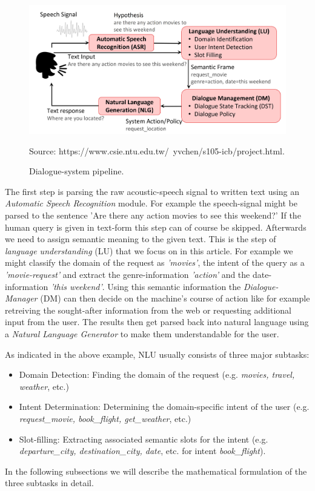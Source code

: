 \documentclass[twoside,11pt,a4paper]{article}
\theoremstyle{break}
\begin{document}
\begin{figure}
	\begin{center}
		\includegraphics[width=13cm]{pipeline.jpg}
		\caption{Dialogue-system pipeline.}
		Source: https://www.csie.ntu.edu.tw/~yvchen/s105-icb/project.html.
		\label{fig:pipeline}
	\end{center}
\end{figure}

The first step is parsing the raw acoustic-speech signal to written text using an \textit{Automatic Speech Recognition} module. For example the speech-signal might be parsed to the sentence 'Are there any action movies to see this weekend?' If the human query is given in text-form this step can of course be skipped. Afterwards we need to assign semantic meaning to the given text. This is the step of \textit{language understanding} (LU) that we focus on in this article. For example we might classify the domain of the request as \textit{'movies'}, the intent of the query as a \textit{'movie-request'} and extract the genre-information \textit{'action'} and the date-information \textit{'this weekend'}. Using this semantic information the \textit{Dialogue-Manager} (DM) can then decide on the machine's course of action like for example retreiving the sought-after information from the web or requesting additional input from the user. The results then get parsed back into natural language using a \textit{Natural Language Generator} to make them understandable for the user.\par
As indicated in the above example, NLU usually consists of three major subtasks:
\begin{itemize}
	\item Domain Detection: Finding the domain of the request (e.g. \textit{movies, travel, weather}, etc.)
	\item Intent Determination: Determining the domain-specific intent of the user (e.g. \textit{request\_movie, book\_flight, get\_weather}, etc.)
	\item Slot-filling: Extracting associated semantic slots for the intent (e.g. \textit{departure\_city, destination\_city, date}, etc. for intent \textit{book\_flight}).
\end{itemize}
In the following subsections we will describe the mathematical formulation of the three subtasks in detail.
\end{document}
